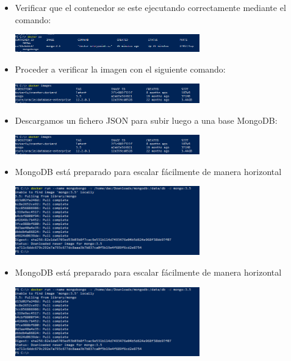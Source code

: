 \documentclass[%
 reprint,
 amsmath,amssymb,
 aps,
]{revtex4-1}
\begin{document}
\begin{itemize}
\begin{center}
		\end{center}	
		\item Verificar que el contenedor se este ejecutando correctamente mediante el comando:
                     \begin{center}
		\includegraphics[width=8cm]{./Imagenes/9}
		\end{center}	
                     \item Proceder a verificar la imagen con el siguiente comando:
                     \begin{center}
		\includegraphics[width=8cm]{./Imagenes/10}
		\end{center}	
                     \item Descargamos un fichero JSON  para subir luego a una base MongoDB:
                     \begin{center}
		\includegraphics[width=8cm]{./Imagenes/10}
		\end{center}	
                     \item MongoDB está preparado para escalar fácilmente de manera horizontal
                     \begin{center}
		\includegraphics[width=8cm]{./Imagenes/7}
		\end{center}	
                     \item MongoDB está preparado para escalar fácilmente de manera horizontal
                     \begin{center}
		\includegraphics[width=8cm]{./Imagenes/7}

\end{center}
\end{itemize}
\end{document}
